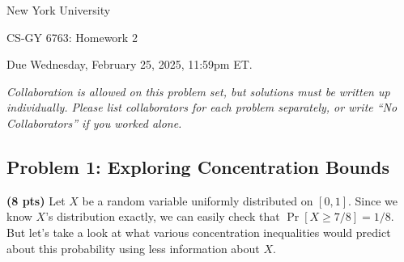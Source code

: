 \documentclass[10pt]{article}
\begin{document}
\begin{center}
	\normalsize
	New York University
	\medskip

	\large
	CS-GY 6763: Homework 2

	Due Wednesday, February 25, 2025, 11:59pm ET.
	\medskip

	\normalsize
	\noindent \emph{Collaboration is allowed on this problem set, but solutions must be written up individually. Please list collaborators for each problem separately, or write ``No Collaborators'' if you worked alone.}
\end{center}

\subsection{Problem 1: Exploring Concentration Bounds}
\textbf{(8 pts)} Let $X$ be a random variable uniformly distributed on $[0,1]$. Since we know $X$'s distribution exactly, we can easily check that $\Pr[X \geq 7/8] = 1/8$. But let's take a look at what various concentration inequalities would predict about this probability using less information about $X$.
\end{document}
